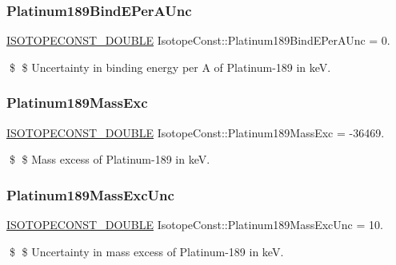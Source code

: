 \subsubsection{\texorpdfstring{Platinum189\+Bind\+E\+Per\+A\+Unc}{Platinum189BindEPerAUnc}}
{\footnotesize\ttfamily \mbox{\hyperlink{group___isotope_const-_macros_ga8f45a7272ce02c0b4c65c44636ed719a}{I\+S\+O\+T\+O\+P\+E\+C\+O\+N\+S\+T\+\_\+\+D\+O\+U\+B\+LE}} Isotope\+Const\+::\+Platinum189\+Bind\+E\+Per\+A\+Unc = 0.}

\$ \$ Uncertainty in binding energy per A of Platinum-\/189 in keV. \mbox{\label{group___isotope_const-_platinum-_pt189_ga90d3863a005446d47f08765bd2794f2f}} 
\subsubsection{\texorpdfstring{Platinum189\+Mass\+Exc}{Platinum189MassExc}}
{\footnotesize\ttfamily \mbox{\hyperlink{group___isotope_const-_macros_ga8f45a7272ce02c0b4c65c44636ed719a}{I\+S\+O\+T\+O\+P\+E\+C\+O\+N\+S\+T\+\_\+\+D\+O\+U\+B\+LE}} Isotope\+Const\+::\+Platinum189\+Mass\+Exc = -\/36469.}

\$ \$ Mass excess of Platinum-\/189 in keV. \mbox{\label{group___isotope_const-_platinum-_pt189_ga17a044d0134a269d637919513f9525e9}} 
\subsubsection{\texorpdfstring{Platinum189\+Mass\+Exc\+Unc}{Platinum189MassExcUnc}}
{\footnotesize\ttfamily \mbox{\hyperlink{group___isotope_const-_macros_ga8f45a7272ce02c0b4c65c44636ed719a}{I\+S\+O\+T\+O\+P\+E\+C\+O\+N\+S\+T\+\_\+\+D\+O\+U\+B\+LE}} Isotope\+Const\+::\+Platinum189\+Mass\+Exc\+Unc = 10.}

\$ \$ Uncertainty in mass excess of Platinum-\/189 in keV. \mbox{\label{group___isotope_const-_platinum-_pt189_ga9507f31bebca88f6e1959e8a75004a97}} 
